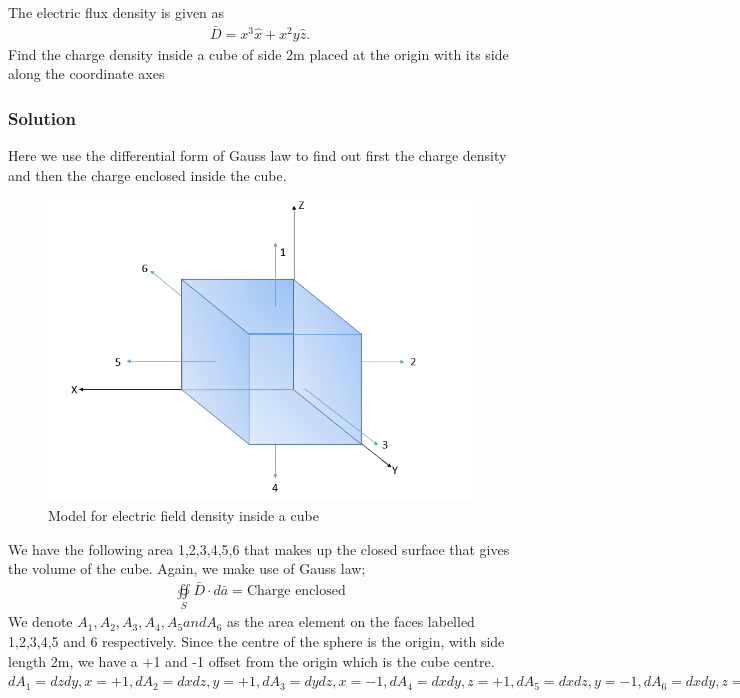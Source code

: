 \begin{exmp}
	The electric flux density is given as
	\begin{align*}
			\bar{D}=x^{3}\hat{x} + x^{2}y\hat{z}.
		\end{align*}
	Find the charge density inside a cube of side 2m placed at the origin with its side along the coordinate axes
	
	\subsubsection*{Solution}
	
	Here we use the differential form of Gauss law to find out first the charge density and then the charge enclosed inside the cube.\\
	\begin{figure}[h]
			\centering
			\includegraphics[width=0.9\linewidth]{graphics/fig150}
			\caption{Model for electric field density inside a cube}
		\end{figure}
	
	We have the following area 1,2,3,4,5,6 that makes up the closed surface that gives the volume of the cube. Again, we make use of Gauss law;
	\begin{align*}
			\oiint\limits_S\bar{D}\cdot d\bar{a} = \text{Charge enclosed}
		\end{align*}
	We denote $A_1,A_2,A_3,A_4,A_5 and A_6$ as the area element on the faces labelled 1,2,3,4,5 and 6 respectively. Since the centre of the sphere is the origin, with side length 2m, we have a +1 and -1 offset from the origin which is the cube centre.\\
	
	$dA_1 = dzdy, x= +1, dA_2 = dxdz, y= +1, dA_3 = dydz, x= -1, dA_4 = dxdy, z= +1, dA_5 = dxdz, y= -1, dA_6 = dxdy, z= -1 $\\
	

\end{exmp}
